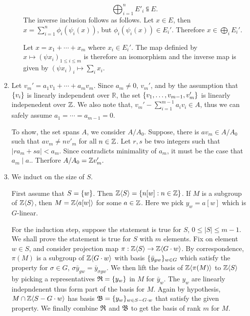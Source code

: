 \documentclass{article}
\theoremstyle{definition}
\theoremstyle{remark}
\begin{document}
\begin{enumerate}[(1)]
\begin{enumerate}[(a)]
        $$\bigoplus_{i=1}^n E'_i \subseteqq E.$$
        The inverse inclusion follows as follows. Let $x \in E$, then $x = \sum_{i=1}^n \phi_i(\psi_i(x))$, but $\phi_i(\psi_i(x)) \in E_i'$. Therefore $x \in \bigoplus_i E_i'.$

        Let $x = x_1 +\cdots + x_m$ where $x_i \in E_i'$. The map definied by $x \mapsto (\psi x_i)_{1 \leq i \leq m}$ is therefore an isomorphism and the inverse map is given by $(\psi x_i)_i \mapsto \sum_i x_i.$
    \end{enumerate}
\item  Let $v_m' = a_1v_1 + \cdots + a_{m}v_{m}$. Since $a_m \neq 0$, $v_m'$, and by the assumption that $\{v_i\}$ is linearly independent over $\mathbb{R}$, the set $\{v_1, \dots, v_{m-1}, v'_{m}\}$ is linearly indepenedent over $\mathbb{Z}$. We also note that, $v_m' -  \sum_{i = 1}^{m-1} a_iv_i \in A$, thus we can safely assume $a_1 = \cdots = a_{m-1}= 0.$

To show, the set spans $A$, we consider  $A/A_0.$  Suppose, there is $av_m \in A/A_0$ such that $av_m \neq  nv'_m$ for all $ n \in \mathbb{Z}$. Let $r, s$ be two integers such that $|ra_m + sa| < a_m$.  Since contradicts minimality of $a_m$, it must be the case that $a_m \mid a.$. Therfore $A/A_0 = \mathbb{Z} v'_m.$ 

  \newcommand{\zmono}[1]{\ZZ\gen{#1}}
  \item We induct on the size of $S.$

        First assume that $S = \{ w \}$. Then $\zmono{S} = \set{n[w] : n \in \ZZ}$. If $M$ is a subgroup of $\zmono{S}$, then $M = \zmono{a[w]}$ for some $a \in \mathbb{Z}$. Here we pick $y_w = a[w]$ which is $G$-linear.

        For the induction step, suppose the statement is true for $S$, $0 \leq |S| \leq m - 1.$ We shall prove the statement is true for $S$ with $m$ elements. Fix on element $w \in S$, and consider projection map $\pi: \zmono S \to \zmono{G \cdot w}$. By correspondence, $\pi(M)$ is a subgroup of $\zmono{G \cdot w}$ with basis $\{\bar y_{gw}\}_{w \in G}$  which satisfy the property for $\sigma \in G$, $\sigma \bar y_{gw} = \bar y_{\sigma g w}$. We then lift the basis of $\zmono{\pi(M)}$ to $\zmono{S}$ by picking a representatives $\mathfrak{R} = \{y_w\}$ in $M$ for $\bar y_w$. The $y_w$ are linearly indepndenent thus form part of the basis for $M$. Again by hypothesis, $M \cap \zmono{S - G\cdot w}$ has basis $\mathfrak{B} = \{y_w\}_{w \in S - G \cdot w}$ that satisfy the given property. We finally combine $\mathfrak{R}$ and $\mathfrak{B}$ to get the basis of rank $m$ for $M$.


\end{enumerate}
\end{document}
